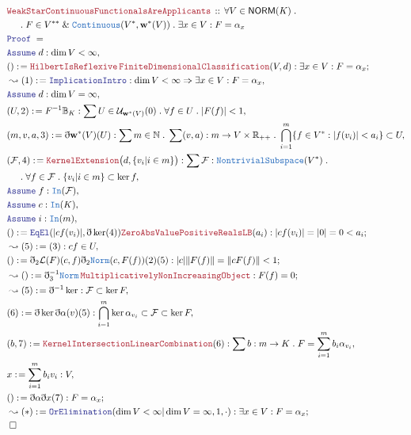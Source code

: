 \documentclass[12pt]{scrartcl}
\newcommand{\TYPE}[1]{\textcolor{NavyBlue}{\mathtt{#1}}}
\newcommand{\LOGIC}[1]{\textcolor{Blue}{\mathtt{#1}}}
\newcommand{\THM}[1]{\textcolor{Maroon}{\mathtt{#1}}}
\renewcommand{\.}{\; . \;}
\newcommand{\de}{: \kern 0.1pc =}
\newcommand{\Theorem}[2]{& \THM{#1} \, :: \, #2 \\ & \Proof = \\ }
\newcommand{\NewLine}{\\ & \kern 1pc}
\newcommand{\Page}[1]{\begin{align*} #1 \end{align*} \newpage   }
\newcommand{ \bd }{ \ByDef }
\renewcommand{\And}{\; \& \;}
\newcommand{\Reals}{\mathbb{R} }
\newcommand{\Nat}{\mathbb{N} }
\newcommand{\Say}[3]{& #1 \de #2 : #3, \\}
\newcommand{\Conclude}[3]{& #1 \de #2 : #3; \\}
\newcommand{\Derive}[3]{& \leadsto #1 \de #2 : #3, \\}
\newcommand{\DeriveConclude}[3]{& \leadsto #1 \de #2 : #3 ; \\}
\newcommand{\A}{\LOGIC{Assume} \;}
\newcommand{\Assume}[2]{& \A #1 : #2, \\}
\newcommand{\QED}{\; \square}
\newcommand{\EndProof}{& \QED \\}
\newcommand{\ByDef}{\eth}
\newcommand{\Proof}{\LOGIC{Proof} \; }
\newcommand{\NORM}{\textsf{NORM}}
\begin{document}
\Page{
\Theorem{WeakStarContinuousFunctionalsAreApplicants}{ \forall V \in \NORM(K) \.
 \NewLine \. F \in V^{**} \And \TYPE{Continuous}(V^*, \mathbf{w}^*(V)) \.
 \exists x \in V  : F = \alpha_x 
 }
 \Assume{d}{\dim V < \infty}
 \Conclude{()}{\THM{HilbertIsReflexive} \, \THM{FiniteDimensionalClassification}(V,d)}{ \exists x \in V : F = \alpha_x}
 \Derive{(1)}{\LOGIC{ImplicationIntro}}{ \dim V < \infty \Rightarrow \exists x \in V : F = \alpha_x } 
 \Assume{d}{\dim V = \infty}
 \Say{(U,2)}{ F^{-1} \mathbb{B}_K }{ \sum U \in \mathcal{U}_{\mathbf{w}^*(V)}(0) \. \forall f \in U \. | F(f) | < 1}
 \Say{(m,v,a,3)}{\bd \mathbf{w}^*(V)(U)}{\sum m \in \Nat \.  \sum (v,a) : m \to V \times \Reals_{++} \. 
  \bigcap^m_{i = 1}\{ f \in V^* : |f(v_i)| < a_i \} \subset U
  }
 \Say{(\mathcal{F},4)}{\THM{KernelExtension}\big(d,  \{ v_i | i \in m \}\big)}{\sum \mathcal{F} : \TYPE{NontrivialSubspace}(V^*) \.
 \NewLine \. 
  \forall f \in \mathcal{F} \.  \{ v_i | i \in m \} \subset \ker f }
  \Assume{f}{ \TYPE{In}(\mathcal{F})}
  \Assume{c}{\TYPE{In}(K)}
  \Assume{i}{\TYPE{In}(m)}
  \Conclude{()}{ \LOGIC{EqEl}(| cf(v_i) |, \bd \ker (4) )\THM{ZeroAbsValue}\THM{PositiveRealsLB}(a_i)}{ | cf(v_i) |  = | 0 | = 0 < a_i }
  \Derive{(5)}{(3)}{cf \in U}
  \Conclude{()}{\bd_2 \mathcal{L}(F)(c,f) \bd_2 \TYPE{Norm}(c,F(f))(2)(5)}{|c|\| F(f) \| = \| cF(f) \| < 1  }
  \DeriveConclude{()}{\bd^{-1}_3 \TYPE{Norm} \, \THM{MultiplicativelyNonIncreasingObject}}{F(f) = 0}
  \Derive{(5)}{\bd^{-1} \ker}{ \mathcal{F} \subset \ker F} 
  \Say{(6)}{\bd \ker \bd \alpha(v)(5)}{ \bigcap^m_{i = 1} \ker \alpha_{v_i} \subset \mathcal{F}  \subset \ker F}
  \Say{(b,7)}{\THM{KernelIntersectionLinearCombination}(6)}{\sum b : m \to K \. F = \sum^m_{i = 1} b_i \alpha_{v_i} }
  \Say{x}{\sum^m_{i = 1} b_i{v_i}}{V}
  \Conclude{()}{\bd \alpha \bd x (7)}{F = \alpha_x}
  \DeriveConclude{(*)}{\LOGIC{OrElimination}(\dim V < \infty | \dim V = \infty,1,\cdot)}{ \exists x \in V  : F = \alpha_x }
  \EndProof
 }
\end{document}
